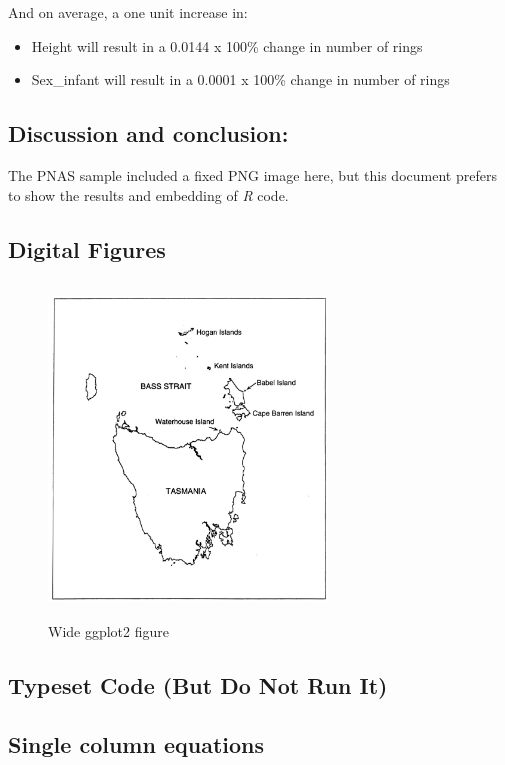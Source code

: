 \documentclass[letterpaper,9pt,twocolumn,twoside,]{pinp}
\providecommand{\tightlist}{%
  \setlength{\itemsep}{0pt}\setlength{\parskip}{0pt}}
\begin{document}
And on average, a one unit increase in:

\begin{itemize}
\tightlist
\item
  Height will result in a 0.0144 x 100\% change in number of rings
\item
  Sex\_infant will result in a 0.0001 x 100\% change in number of rings
\end{itemize}

\subsection{Discussion and conclusion:}\label{discussion-and-conclusion}

The PNAS sample included a fixed PNG image here, but this document
prefers to show the results and embedding of \emph{R} code.

\subsection{Digital Figures}\label{digital-figures}

\begin{figure}
  \begin{center}
    \includegraphics[width=0.66\textwidth, height=3.5in]{Independence} 
  \end{center}
  \caption{Wide ggplot2 figure}\label{fig}
\end{figure}

\subsection{Typeset Code (But Do Not Run
It)}\label{typeset-code-but-do-not-run-it}

\subsection{Single column equations}\label{single-column-equations}

\showacknow




\end{document}
